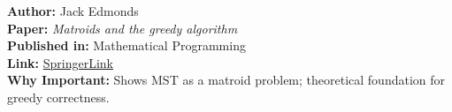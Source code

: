 \documentclass[14pt,a4paper]{extarticle}
\begin{document}
\begin{tcolorbox}[title=7. Matroid Theory and Greedy MST (1971)]
\textbf{Author:} Jack Edmonds \\
\textbf{Paper:} \textit{Matroids and the greedy algorithm} \\
\textbf{Published in:} Mathematical Programming \\
\textbf{Link:} \href{https://doi.org/10.1007/BF01585995}{SpringerLink} \\
\textbf{Why Important:} Shows MST as a matroid problem; theoretical foundation for greedy correctness.
\end{tcolorbox}



\end{document}
